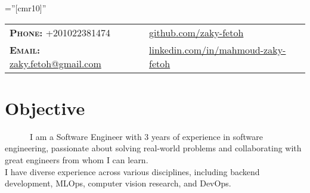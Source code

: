 \documentclass[a4paper,10pt]{article}
\begin{document}
\pagestyle{fancy}
\fancyhead{} 
\renewcommand{\headrulewidth}{0pt}

\font\fb=''[cmr10]'' 
\par{\bigskip\par} %


\begin{tabular}{lp{4cm}l}
\textbf{\textsc{Phone:}} +201022381474 && \href{https://github.com/zaky-fetoh}{github.com/zaky-fetoh} \\
\textbf{\textsc{Email:}}   \href{mailto:zaky.fetoh@gmail.com}{zaky.fetoh@gmail.com} &&\href{https://www.linkedin.com/in/mahmoud-zaky-fetoh/}{linkedin.com/in/mahmoud-zaky-fetoh}\\

\end{tabular}

\section{\textbf{Objective}}
~~~~~~I am a Software Engineer with 3 years of experience in software engineering, passionate about solving real-world problems and collaborating with great engineers from whom I can learn. \\
I have diverse experience across various disciplines, including backend development, MLOps, computer vision research, and DevOps. 


\end{document}
